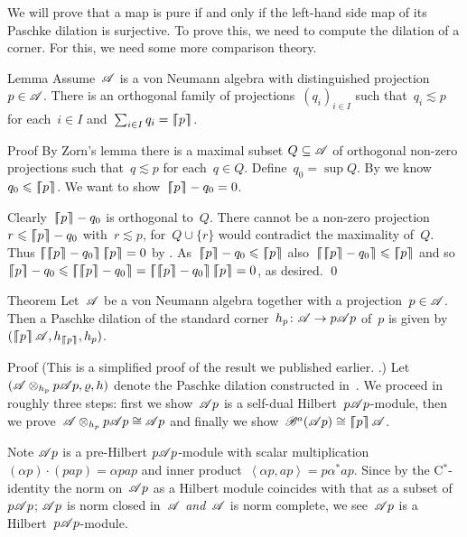 \documentclass[b]{subfiles}
\begin{document}
\begin{parsec}%
\begin{point}%
We will prove that a map is pure if and only if
    the left-hand side map of its Paschke dilation
    is surjective.  To prove this, we need to compute the dilation of a corner.
For this, we need some more comparison theory.
\end{point}
\begin{point}{Lemma}%
Assume~$\mathscr{A}$ is a von Neumann algebra with distinguished projection~$p \in \mathscr{A}$.
There is an orthogonal family of projections~$(q_i)_{i \in I}$
    such that~$q_i \lesssim p$ for each~$i \in I$
    and~$\sum_{i \in I} q_i = \left\lceil\!\!\left\lceil p\right\rceil\!\!\right\rceil$.
\begin{point}{Proof}%
By Zorn's lemma there is a maximal subset $Q \subseteq \mathscr{A}$ of orthogonal
    non-zero projections
    such that~$q \lesssim p$ for each~$q \in Q$.
Define~$q_0 = \sup Q$.
By 
    we know~$q_0 \leqslant \left\lceil\!\!\left\lceil p\right\rceil\!\!\right\rceil$.
We want to show~$\left\lceil\!\!\left\lceil p\right\rceil\!\!\right\rceil - q_0 = 0$.

Clearly~$\left\lceil\!\!\left\lceil p\right\rceil\!\!\right\rceil - q_0$ is orthogonal to~$Q$.
There cannot be a non-zero projection~$r \leqslant \left\lceil\!\!\left\lceil p\right\rceil\!\!\right\rceil - q_0$
    with~$r \lesssim p$,
    for~$Q \cup \{r \}$ would contradict the maximality of~$Q$.
Thus $\cceil{\cceil{p} - q_0} \cceil{p} = 0$
    by .
As~$\cceil{p} - q_0 \leq \cceil{p}$
    also~$\cceil{\cceil{p}-q_0} \leq \cceil{p}$
    and so~$ \cceil{p} - q_0 \leq \cceil{\cceil{p} - q_0}
                = \cceil{\cceil{p}-q_0}\cceil{p} = 0$, as desired. \qed
\end{point}
\end{point}
\begin{point}{Theorem}%
Let~$\mathscr{A}$ be a von Neumann algebra together with a projection~$p \in \mathscr{A}$.
Then a Paschke dilation of the standard corner~$h_p \colon \mathscr{A} \to p\mathscr{A} p$
of~$p$ is given by~$(\cceil{p}\scrA, h_{\cceil{p}}, h_p)$.
\begin{point}{Proof}%
(This is a simplified proof of the result we published earlier.
    \cite[Thm.~28]{wwpaschke}.)
Let~$(\mathscr{A} \otimes_{h_p} p\mathscr{A} p, \varrho, h)$
    denote the Paschke dilation constructed in~.
We proceed in roughly three steps:
    first we show~$\mathscr{A} p$ is a self-dual Hilbert~$p\mathscr{A} p$-module,
    then we prove~$\mathscr{A} \otimes_{h_p} p\mathscr{A} p \cong \mathscr{A} p$
    and finally we show~$\mathscr{B}^a(\mathscr{A} p) \cong \left\lceil\!\!\left\lceil p\right\rceil\!\!\right\rceil \mathscr{A}$.
\begin{point}%
Note $\mathscr{A} p$ is a pre-Hilbert $p \mathscr{A} p$-module
    with scalar multiplication~$(\alpha p)\cdot (pap) = \alpha pap$
    and inner product~$\left<\alpha p, ap\right> = p\alpha^*ap$.
Since by the C$^*$-identity the norm on~$\mathscr{A} p$
    as a Hilbert module coincides with that as a subset of~$p \mathscr{A} p$;
    $\mathscr{A} p$ is norm closed in~$\mathscr{A}$ \emph{and}~$\mathscr{A}$ is norm complete,
    we see~$\mathscr{A} p$ is a Hilbert~$p \mathscr{A} p$-module.


\end{point}
\end{point}
\end{point}
\end{parsec}
\end{document}
